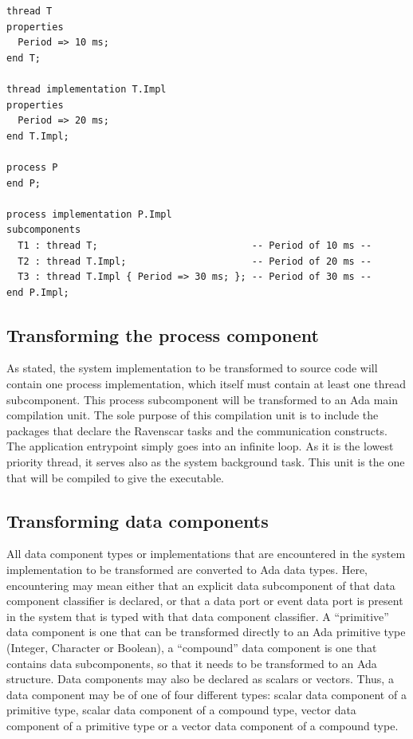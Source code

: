 \begin{minipage}[htbp]{\listingwidth}
\lstset{language=aadl}
\begin{lstlisting}[label=lst:effective_prop, caption=The various
    property overriding options]
thread T
properties
  Period => 10 ms;
end T;

thread implementation T.Impl
properties
  Period => 20 ms;
end T.Impl;

process P
end P;

process implementation P.Impl
subcomponents
  T1 : thread T;                           -- Period of 10 ms --
  T2 : thread T.Impl;                      -- Period of 20 ms --
  T3 : thread T.Impl { Period => 30 ms; }; -- Period of 30 ms --
end P.Impl;
\end{lstlisting}
\end{minipage}

\subsection{Transforming the process component}
As stated, the system implementation to be transformed to source code
will contain one process implementation, which itself must contain at
least one thread subcomponent. This process subcomponent will be
transformed to an Ada main compilation unit. The sole purpose of this
compilation unit is to include the packages that declare the Ravenscar
tasks and the communication constructs. The application entrypoint
simply goes into an infinite loop. As it is the lowest priority
thread, it serves also as the system background task. This unit is the
one that will be compiled to give the executable.

\subsection{Transforming data components}
All data component types or implementations that are encountered in
the system implementation to be transformed are converted to Ada data
types. Here, encountering may mean either that an explicit data
subcomponent of that data component classifier is declared, or that a
data port or event data port is present in the system that is typed
with that data component classifier. A ``primitive'' data component is
one that can be transformed directly to an Ada primitive type
(Integer, Character or Boolean), a ``compound'' data component is one
that contains data subcomponents, so that it needs to be transformed
to an Ada  structure. Data components may also be declared
as scalars or vectors. Thus, a data component may be of one of four
different types: scalar data component of a primitive type, scalar
data component of a compound type, vector data component of a
primitive type or a vector data component of a compound type.

